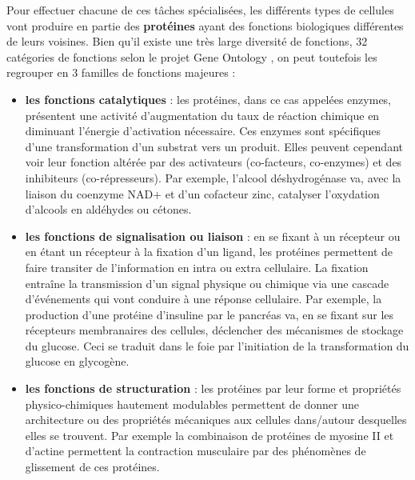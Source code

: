 
Pour effectuer chacune de ces tâches spécialisées, les différents types de cellules vont produire en partie des \textbf{protéines} ayant des fonctions biologiques différentes de leurs voisines. Bien qu'il existe une très large diversité de fonctions, 32 catégories de fonctions selon le projet Gene Ontology \cite{Ashburner2000}, on peut toutefois les regrouper en 3 familles de fonctions majeures \cite{Mathews2012}:  
\begin{itemize}
    \item \textbf{les fonctions catalytiques} : les protéines, dans ce cas appelées enzymes, présentent une activité d'augmentation du taux de réaction chimique en diminuant l'énergie d'activation nécessaire. Ces enzymes sont spécifiques d'une transformation d'un substrat vers un produit. Elles peuvent cependant voir leur fonction altérée par des activateurs (co-facteurs, co-enzymes) et des inhibiteurs (co-répresseurs). Par exemple, l'alcool déshydrogénase va, avec la liaison du coenzyme NAD+ et d'un cofacteur zinc, catalyser l'oxydation d'alcools en aldéhydes ou cétones.
    \item \textbf{les fonctions de signalisation ou liaison} : en se fixant à un récepteur ou en étant un récepteur à la fixation d'un ligand, les protéines permettent de faire transiter de l'information en intra ou extra cellulaire. La fixation entraîne la transmission d'un signal physique ou chimique via une cascade d'événements qui vont conduire à une réponse cellulaire. Par exemple, la production d'une protéine d'insuline par le pancréas va, en se fixant sur les récepteurs membranaires des cellules, déclencher des mécanismes de stockage du glucose. Ceci se traduit dans le foie par l'initiation de la transformation du glucose en glycogène.
    \item \textbf{les fonctions de structuration} : les protéines par leur forme et propriétés physico-chimiques hautement modulables permettent de donner une architecture ou des propriétés mécaniques aux cellules dans/autour desquelles elles se trouvent. Par exemple la combinaison de protéines de myosine II et d'actine permettent la contraction musculaire par des phénomènes de glissement de ces protéines.
\end{itemize}


